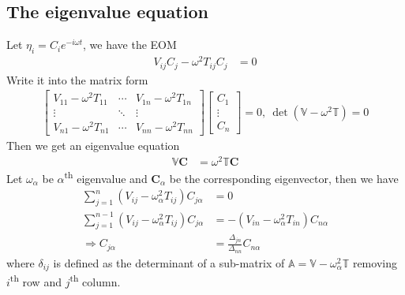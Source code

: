 \documentclass[twoside,9pt]{article}
\numberwithin{equation}{section} %
\theoremstyle{definition}
\theoremstyle{remark}
\begin{document}
\subsection{The eigenvalue equation}
Let $\eta_i = C_ie^{-i\omega t}$, we have the EOM
\begin{align}
    V_{ij}C_j - \omega^2 T_{ij} C_j &= 0
\end{align}
Write it into the matrix form
\begin{align}
    \begin{bmatrix}
        V_{11} - \omega^2T_{11} & \cdots & V_{1n} - \omega^2 T_{1n}\\
        \vdots & \ddots & \vdots \\
        V_{n1} - \omega^2T_{n1} & \cdots & V_{nn} - \omega^2T_{nn}
    \end{bmatrix}
    \begin{bmatrix}
        C_1\\ \vdots\\ C_n
    \end{bmatrix} = 0,~ \det(\mathbb V - \omega^2 \mathbb T) = 0
\end{align}
Then we get an eigenvalue equation
\begin{align}
    \mathbb V\mathbf{C} &= \omega^2\mathbb T\mathbf{C}
\end{align}
Let $\omega_\alpha$ be $\alpha$\textsuperscript{th} eigenvalue
and $\mathbf{C}_\alpha$ be the corresponding eigenvector, then we have
\begin{align}
    \sum_{j=1}^n(V_{ij} - \omega_\alpha^2 T_{ij})C_{j\alpha} &= 0\\
    \sum_{j=1}^{n-1}(V_{ij} - \omega_\alpha^2 T_{ij})C_{j\alpha} &=
    -(V_{in}-\omega_\alpha^2 T_{in})C_{n\alpha}\\
    \Rightarrow
    C_{j\alpha} &= \frac{\Delta_{jn}}{\Delta_{nn}}C_{n\alpha}
\end{align}
where $\delta_{ij}$ is defined as the determinant of a sub-matrix of
$\mathbb A = \mathbb V - \omega_\alpha^2\mathbb T$ removing
$i$\textsuperscript{th} row and $j$\textsuperscript{th} column.
\end{document}
